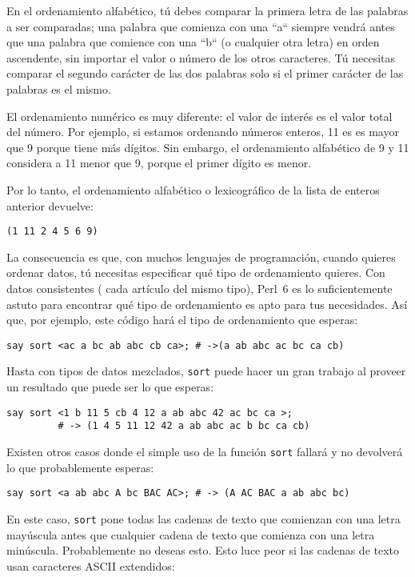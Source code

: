 En el ordenamiento alfabético, tú debes comparar la primera
letra de las palabras a ser comparadas; una palabra 
que comienza con una ``a`` siempre vendrá antes que una palabra
que comience con una ``b`` (o cualquier otra letra) en
orden ascendente, sin importar el valor o número de los 
otros caracteres. Tú necesitas comparar el segundo carácter
de las dos palabras solo si el primer carácter de las palabras
es el mismo.

El ordenamiento numérico es muy diferente: el valor de
interés es el valor total del número. Por ejemplo, si estamos
ordenando números enteros, 11 es es mayor que 9 porque tiene 
más dígitos. Sin embargo, el ordenamiento alfabético de 9 y 11
considera a 11 menor que 9, porque el primer dígito es menor.

Por lo tanto, el ordenamiento alfabético o lexicográfico de la
lista de enteros anterior devuelve:

\begin{verbatim}
(1 11 2 4 5 6 9)
\end{verbatim}

La consecuencia es que, con muchos lenguajes de programación,
cuando quieres ordenar datos, tú necesitas especificar qué
tipo de ordenamiento quieres. Con datos consistentes (
cada artículo del mismo tipo), Perl~6 es lo suficientemente
astuto para encontrar qué tipo de ordenamiento es apto para
tus necesidades. Así que, por ejemplo, este código hará
el tipo de ordenamiento que esperas:

\begin{verbatim}
say sort <ac a bc ab abc cb ca>; # ->(a ab abc ac bc ca cb)
\end{verbatim}

Hasta con tipos de datos mezclados, {\tt sort} puede hacer 
un gran trabajo al proveer un resultado que puede ser lo que
esperas:

\begin{verbatim}
say sort <1 b 11 5 cb 4 12 a ab abc 42 ac bc ca >;
         # -> (1 4 5 11 12 42 a ab abc ac b bc ca cb)
\end{verbatim}

Existen otros casos donde el simple uso de la función
{\tt sort} fallará y no devolverá lo que probablemente
esperas:

\begin{verbatim}
say sort <a ab abc A bc BAC AC>; # -> (A AC BAC a ab abc bc)
\end{verbatim}
%

En este caso, {\tt sort} pone todas las cadenas de texto
que comienzan con una letra mayúscula antes que cualquier 
cadena de texto que comienza con una letra minúscula. Probablemente
no deseas esto. Esto luce peor si las cadenas de texto usan
caracteres ASCII extendidos:


